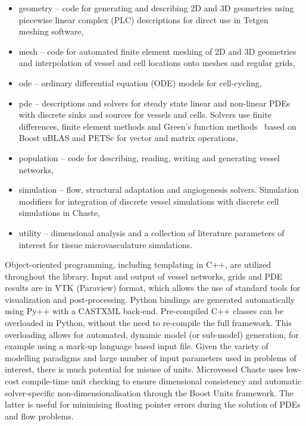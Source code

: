 \documentclass[10pt,letterpaper]{article}
\begin{document}
\begin{itemize}
	\item geometry -- code for generating and describing 2D and 3D geometries using piecewise linear complex (PLC) descriptions for direct use in Tetgen~\cite{Si2015} meshing software,
	\item mesh -- code for automated finite element meshing of 2D and 3D geometries and interpolation of vessel and cell locations onto meshes and regular grids,
	\item ode -- ordinary differential equation (ODE) models for cell-cycling,
	\item pde -- descriptions and solvers for steady state linear and non-linear PDEs with discrete sinks and sources for vessels and cells. Solvers use finite differences, finite element methods and Green's function methods~\cite{Secomb2013} based on Boost uBLAS and PETSc for vector and matrix operations,
	\item population -- code for describing, reading, writing and generating vessel networks,
	\item simulation -- flow, structural adaptation and angiogenesis solvers. Simulation modifiers for integration of discrete vessel simulations with discrete cell simulations in Chaste,
	\item utility -- dimensional analysis and a collection of literature parameters of interest for tissue microvasculature simulations.	
\end{itemize}

Object-oriented programming, including templating in C++, are utilized throughout the library. Input and output of vessel networks, grids and PDE results are in VTK (Paraview) format, which allows the use of standard tools for visualization and post-processing. Python bindings are generated automatically using Py++ with a CASTXML back-end. Pre-compiled C++ classes can be overloaded in Python, without the need to re-compile the full framework. This overloading allows for automated, dynamic model (or sub-model) generation, for example using a mark-up language based input file. Given the variety of modelling paradigms and large number of input parameters used in problems of interest, there is much potential for misuse of units. Microvessel Chaste uses low-cost compile-time unit checking to ensure dimensional consistency and automatic solver-specific non-dimensionalisation through the Boost Units framework. The latter is useful for minimising floating pointer errors during the solution of PDEs and flow problems.
\end{document}
